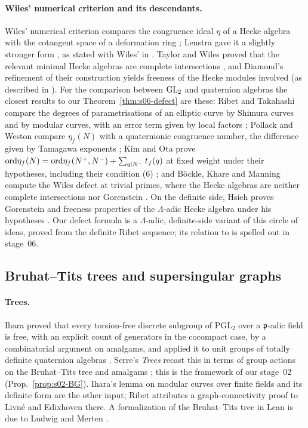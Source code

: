 \paragraph{Wiles' numerical criterion and its descendants.} Wiles' numerical criterion compares the congruence ideal $\eta$ of a
Hecke algebra with the cotangent space of a deformation ring \cite[Appendix, Props.~1, 2]{Wi95}; Lenstra gave it a slightly
stronger form \cite{Len95}, as stated with Wiles' in \cite[Thm.~1.1]{BKM}. Taylor and Wiles proved that the relevant minimal Hecke
algebras are complete intersections \cite[Introduction]{TW95}, and Diamond's refinement of their construction yields freeness of
the Hecke modules involved \cite{DiaInv97} (as described in \cite[\S2]{KO}). For the comparison between $\mathrm{GL}_2$ and quaternion
algebras the closest results to our Theorem~\ref{thm:s06-defect} are these: Ribet and Takahashi compare the degrees of
parametrisations of an elliptic curve by Shimura curves and by modular curves, with an error term given by local factors
\cite[Thm.~1]{RT97}; Pollack and Weston compare $\eta_f(N)$ with a quaternionic congruence number, the difference given by
Tamagawa exponents \cite[Thm.~6.8]{PW}; Kim and Ota prove $\mathrm{ord}\eta_f(N)=\mathrm{ord}\eta_f(N^+,N^-)+\sum_{q\mid N^-}t_f(q)$ at fixed weight
under their hypotheses, including their condition (6) \cite[Thm.~1.1]{KO}; and B\"ockle, Khare and Manning compute the Wiles
defect at trivial primes, where the Hecke algebras are neither complete intersections nor Gorenstein
\cite[\S1, Thm.~1.2]{BKM}. On the definite side, Hsieh proves Gorenstein and freeness properties of the $\Lambda$-adic Hecke
algebra under his hypotheses \cite[Thm.~4.2, Thm.~4.5]{Hs}. Our defect formula is a $\Lambda$-adic, definite-side variant of
this circle of ideas, proved from the definite Ribet sequence; its relation to \cite{KO,PW} is spelled out in stage~06.

\subsection{Bruhat--Tits trees and supersingular graphs}

\paragraph{Trees.} Ihara proved that every torsion-free discrete subgroup of $\mathrm{PGL}_2$ over a $\mathfrak p$-adic field is
free, with an explicit count of generators in the cocompact case, by a combinatorial argument on amalgams, and applied it to unit
groups of totally definite quaternion algebras \cite[\S2, Thm.~1 and Corollary; \S5]{Ih66}. Serre's \emph{Trees} recast this in
terms of group actions on the Bruhat--Tits tree and amalgams \cite[Ch.~II, \S1.4--1.5]{Se}; this is the framework of our
stage~02 (Prop.~\ref{prop:s02-BG}). Ihara's lemma on modular curves over finite fields \cite{Ih75} and its definite form
\cite[Thm.~3.15, Rem.~3.18]{Ri90} are the other input; Ribet attributes a graph-connectivity proof to Livn\'e and Edixhoven there.
A formalization of the Bruhat--Tits tree in Lean is due to Ludwig and Merten \cite{LM}.

